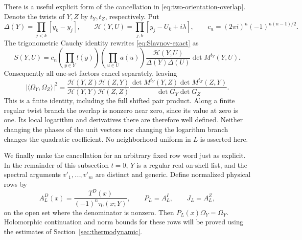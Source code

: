 There is a useful explicit form of the cancellation in
\eqref{eq:two-orientation-overlap}.  Denote the twists of $Y,Z$ by
$t_Y,t_Z$, respectively.  Put
\[
 \Delta(Y)=\prod_{j<k}[y_k-y_j],\qquad
 \mathcal H(Y,U)=\prod_{j,k}[y_j-U_k+i\lambda],\qquad
 c_n=(2\pi i)^n(-1)^{n(n-1)/2}.
\]
The trigonometric Cauchy identity rewrites
\eqref{eq:Slavnov-exact} as
\begin{equation}\label{eq:Slavnov-separated}
 S(Y,U)=c_n\left(\prod_{y\in Y}l(y)\right)
             \left(\prod_{u\in U}a(u)\right)
       \frac{\mathcal H(Y,U)}{\Delta(Y)\Delta(U)}
             \det M^{t_Y}(Y,U).
\end{equation}
Consequently all one-set factors cancel separately, leaving
\begin{equation}\label{eq:overlap-determinant-finite}
 |\langle\Omega_Y,\Omega_Z\rangle|^2
 =\frac{\mathcal H(Y,Z)\mathcal H(Z,Y)}
        {\mathcal H(Y,Y)\mathcal H(Z,Z)}
   \frac{\det M^{t_Y}(Y,Z)\det M^{t_Z}(Z,Y)}
        {\det G_Y\det G_Z}.
\end{equation}
This is a finite identity, including the full shifted pair product.
Along a finite regular twist branch the overlap is nonzero near zero,
since its value at zero is one.  Its local logarithm and derivatives
there are therefore well defined.  Neither changing the phases of the
unit vectors nor changing the logarithm branch changes the quadratic
coefficient.  No neighborhood uniform in $L$ is asserted here.

We finally make the cancellation for an arbitrary fixed row word just
as explicit.  In the remainder of this subsection $t=0$, $Y$ is a
regular real on-shell list, and the spectral arguments $v'_1,\ldots,v'_m$
are distinct and generic.  Define normalized physical rows by
\begin{equation}\label{eq:normalized-finite-row}
 A_L^D(x)=\frac{T^D(x)}{(-1)^n\tau_0(x;Y)},\qquad
 P_L=A_L^I,\qquad J_L=A_L^Z,
\end{equation}
on the open set where the denominator is nonzero.  Then
$P_L(x)\Omega_Y=\Omega_Y$.  Holomorphic continuation and norm bounds
for these rows will be proved using the estimates of
Section~\ref{sec:thermodynamic}.

